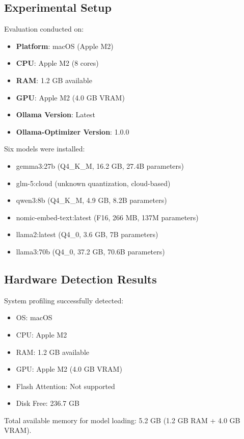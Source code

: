 \documentclass[journal]{IEEEtran}
\begin{document}
\subsection{Experimental Setup}

Evaluation conducted on:
\begin{itemize}
    \item \textbf{Platform}: macOS (Apple M2)
    \item \textbf{CPU}: Apple M2 (8 cores)
    \item \textbf{RAM}: 1.2 GB available
    \item \textbf{GPU}: Apple M2 (4.0 GB VRAM)
    \item \textbf{Ollama Version}: Latest
    \item \textbf{Ollama-Optimizer Version}: 1.0.0
\end{itemize}

Six models were installed:
\begin{itemize}
    \item gemma3:27b (Q4\_K\_M, 16.2 GB, 27.4B parameters)
    \item glm-5:cloud (unknown quantization, cloud-based)
    \item qwen3:8b (Q4\_K\_M, 4.9 GB, 8.2B parameters)
    \item nomic-embed-text:latest (F16, 266 MB, 137M parameters)
    \item llama2:latest (Q4\_0, 3.6 GB, 7B parameters)
    \item llama3:70b (Q4\_0, 37.2 GB, 70.6B parameters)
\end{itemize}

\subsection{Hardware Detection Results}

System profiling successfully detected:
\begin{itemize}
    \item OS: macOS
    \item CPU: Apple M2
    \item RAM: 1.2 GB available
    \item GPU: Apple M2 (4.0 GB VRAM)
    \item Flash Attention: Not supported
    \item Disk Free: 236.7 GB
\end{itemize}

Total available memory for model loading: 5.2 GB (1.2 GB RAM + 4.0 GB VRAM).
\end{document}
